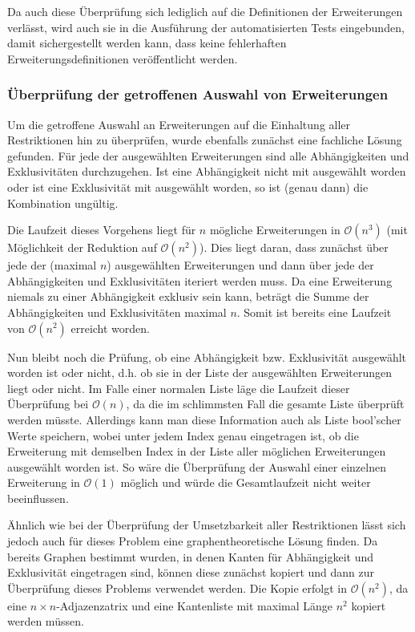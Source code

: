 Da auch diese Überprüfung sich lediglich auf die Definitionen der Erweiterungen verlässt, wird auch sie in die Ausführung der automatisierten Tests eingebunden, damit sichergestellt werden kann, dass keine fehlerhaften Erweiterungsdefinitionen veröffentlicht werden.

\subsubsection{Überprüfung der getroffenen Auswahl von Erweiterungen}
\label{impl:verify_chosen_extensions}
Um die getroffene Auswahl an Erweiterungen auf die Einhaltung aller Restriktionen hin zu überprüfen, wurde ebenfalls zunächst eine fachliche Lösung gefunden. Für jede der ausgewählten Erweiterungen sind alle Abhängigkeiten und Exklusivitäten durchzugehen. Ist eine Abhängigkeit nicht mit ausgewählt worden oder ist eine Exklusivität mit ausgewählt worden, so ist (genau dann) die Kombination ungültig.

Die Laufzeit dieses Vorgehens liegt für $n$ mögliche Erweiterungen in $\mathcal{O}(n^3)$ (mit Möglichkeit der Reduktion auf $\mathcal{O}(n^2)$). Dies liegt daran, dass zunächst über jede der (maximal $n$) ausgewählten Erweiterungen und dann über jede der Abhängigkeiten und Exklusivitäten iteriert werden muss. Da eine Erweiterung niemals zu einer Abhängigkeit exklusiv sein kann, beträgt die Summe der Abhängigkeiten und Exklusivitäten maximal $n$. Somit ist bereits eine Laufzeit von $\mathcal{O}(n^2)$ erreicht worden.

Nun bleibt noch die Prüfung, ob eine Abhängigkeit bzw. Exklusivität ausgewählt worden ist oder nicht, d.h. ob sie in der Liste der ausgewählten Erweiterungen liegt oder nicht. Im Falle einer normalen Liste läge die Laufzeit dieser Überprüfung bei $\mathcal{O}(n)$, da die im schlimmsten Fall die gesamte Liste überprüft werden müsste. Allerdings kann man diese Information auch als Liste bool'scher Werte speichern, wobei unter jedem Index genau eingetragen ist, ob die Erweiterung mit demselben Index in der Liste aller möglichen Erweiterungen ausgewählt worden ist. So wäre die Überprüfung der Auswahl einer einzelnen Erweiterung in $\mathcal{O}(1)$ möglich und würde die Gesamtlaufzeit nicht weiter beeinflussen.

Ähnlich wie bei der Überprüfung der Umsetzbarkeit aller Restriktionen lässt sich jedoch auch für dieses Problem eine graphentheoretische Lösung finden. Da bereits Graphen bestimmt wurden, in denen Kanten für Abhängigkeit und Exklusivität eingetragen sind, können diese zunächst kopiert und dann zur Überprüfung dieses Problems verwendet werden. Die Kopie erfolgt in $\mathcal{O}(n^2)$, da eine $n \times n$-Adjazenzatrix und eine Kantenliste mit maximal Länge $n^2$ kopiert werden müssen.

